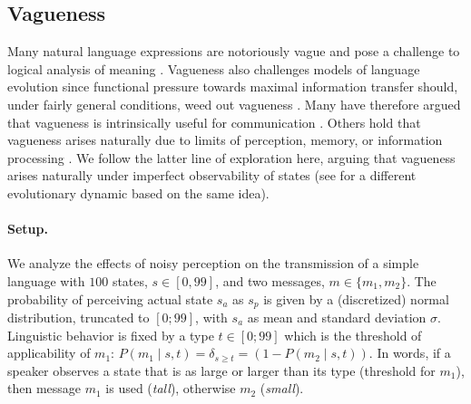 \documentclass[10pt,a4paper]{article}
\newcommand{\mf}[1]{\textcolor{Red}{[MF: #1]}}
\begin{document}

\subsection{Vagueness}

Many natural language expressions are notoriously vague and pose a challenge to logical
analysis of meaning \citep[e.g.][]{Williamson1994:Vagueness}. Vagueness also challenges models
of language evolution since functional pressure towards maximal information transfer should,
under fairly general conditions, weed out vagueness \citep{Lipman2009:Why-is-Language}. Many
have therefore argued that vagueness is intrinsically useful for communication
\citep[e.g.][]{Deemter2009:Utility-and-Lan,Jaegherde-JaegherRooijvan-Rooij2010:Strategic-Vague,BlumeBoard2013:Intentional-Vag}. Others
hold that vagueness arises naturally due to limits of perception, memory, or information
processing
\citep[e.g.][]{FrankeJager2010:Vagueness-Signa,OConnor2013:The-Evolution-o,LassiterGoodman2015:Adjectival-vagu}. We
follow the latter line of exploration here, arguing that vagueness arises naturally under
imperfect observability of states (see \cite{franke+correia:toappear} for a different
evolutionary dynamic based on the same idea).

\paragraph{Setup.}  We analyze the effects of noisy perception on the transmission of a simple
language with $100$ states, $s \in [0,99]$, and two messages, $m \in \{m_1,m_2\}$. The
probability of perceiving actual state $s_a$ as $s_p$ is given by a (discretized) normal
distribution, truncated to $[0;99]$, with $s_a$ as mean and standard deviation
$\sigma$. %
Linguistic behavior is fixed by a type $t \in [0;99]$ which is the threshold of applicability
of $m_1$: $P(m_1 \mid s,t) = \delta_{s \ge t} = (1 - P(m_2 \mid s,t))$. In words, if a speaker observes a
state that is as large or larger than its type (threshold for $m_1$), then message $m_1$ is
used (\emph{tall}), otherwise $m_2$ ({\em small}).
\end{document}

